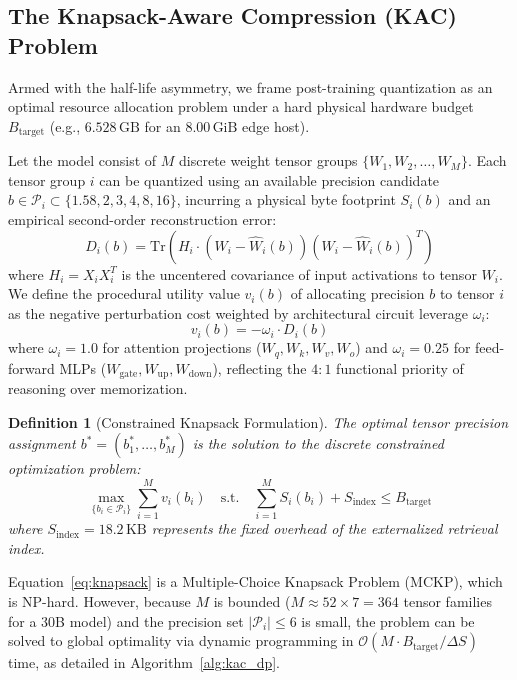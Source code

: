 \documentclass[10pt,twocolumn,letterpaper]{article}
\newtheorem{definition}{Definition}
\begin{document}
\subsection{The Knapsack-Aware Compression (KAC) Problem}
\label{sec:math_knapsack}
Armed with the half-life asymmetry, we frame post-training quantization as an optimal resource allocation problem under a hard physical hardware budget $B_{\text{target}}$ (e.g., $6.528\,\text{GB}$ for an $8.00\,\text{GiB}$ edge host).

Let the model consist of $M$ discrete weight tensor groups $\{W_1, W_2, \dots, W_M\}$. Each tensor group $i$ can be quantized using an available precision candidate $b \in \mathcal{P}_i \subset \{1.58, 2, 3, 4, 8, 16\}$, incurring a physical byte footprint $S_i(b)$ and an empirical second-order reconstruction error:
\begin{equation}
    D_i(b) = \text{Tr}\left( H_i \cdot (W_i - \widehat{W}_i(b))(W_i - \widehat{W}_i(b))^T \right)
\end{equation}
where $H_i = X_i X_i^T$ is the uncentered covariance of input activations to tensor $W_i$. We define the procedural utility value $v_i(b)$ of allocating precision $b$ to tensor $i$ as the negative perturbation cost weighted by architectural circuit leverage $\omega_i$:
\begin{equation}
    v_i(b) = -\omega_i \cdot D_i(b)
\end{equation}
where $\omega_i = 1.0$ for attention projections ($W_q, W_k, W_v, W_o$) and $\omega_i = 0.25$ for feed-forward MLPs ($W_{\text{gate}}, W_{\text{up}}, W_{\text{down}}$), reflecting the $4:1$ functional priority of reasoning over memorization.

\begin{definition}[Constrained Knapsack Formulation]
The optimal tensor precision assignment $b^* = (b_1^*, \dots, b_M^*)$ is the solution to the discrete constrained optimization problem:
\begin{equation}
    \max_{\{b_i \in \mathcal{P}_i\}} \sum_{i=1}^M v_i(b_i) \quad \text{s.t.} \quad \sum_{i=1}^M S_i(b_i) + S_{\text{index}} \le B_{\text{target}}
    \label{eq:knapsack}
\end{equation}
where $S_{\text{index}} = 18.2\,\text{KB}$ represents the fixed overhead of the externalized retrieval index.
\end{definition}

Equation~\eqref{eq:knapsack} is a Multiple-Choice Knapsack Problem (MCKP), which is NP-hard. However, because $M$ is bounded ($M \approx 52 \times 7 = 364$ tensor families for a 30B model) and the precision set $|\mathcal{P}_i| \le 6$ is small, the problem can be solved to global optimality via dynamic programming in $\mathcal{O}(M \cdot B_{\text{target}} / \Delta S)$ time, as detailed in Algorithm~\ref{alg:kac_dp}.
\end{document}
